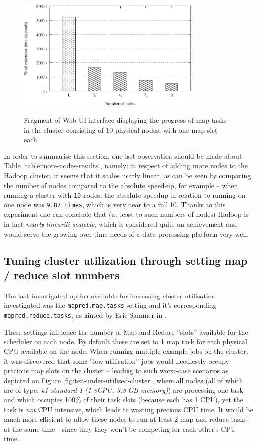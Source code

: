 \begin{figure}[ch!]
  \centering
  \includegraphics[width=0.80\textwidth]{img/hadoop/nodes-perf.pdf}
  \label{fig:nodes-pers-graph}
  \caption{Fragment of Web-UI interface displaying the progress of map tasks in the cluster consisting of 10 physical nodes, with one map slot each.}
\end{figure}

In order to summarise this section, one last observation should be made about Table \ref{table:more-nodes-results}, namely: in respect of adding more nodes to the Hadoop cluster, it seems that it scales nearly linear, as can be seen by comparing the number of nodes compared to the absolute speed-up, for example -- when running a cluster with \verb|10| nodes, the absolute speedup in relation to running on one node was \verb|9.87 times|, which is very near to a full 10. Thanks to this experiment one can conclude that (at least to such numbers of nodes) Hadoop is in fact \textit{nearly linearili scalable}, which is considered quite an achievement and would serve the growing-over-time needs of a data processing platform very well.


\subsection{Tuning cluster utilization through setting map / reduce slot numbers}
The last investigated option available for increasing cluster utilisation investigated was the \verb|mapred.map.tasks| setting and it's corresponding \verb|mapred.reduce.tasks|, as hinted by Eric Sammer in \cite{hadoop-ops}.

These settings influence the number of Map and Reduce ''slots'' available for the scheduler on each node. By default these are set to 1 map task for each physical CPU available on the node. When running multiple example jobs on the cluster, it was discovered that some ''low utilisation'' jobs would needlessly occupy precious map slots on the cluster -- leading to such worst-case scenarios as depicted on Figure \ref{fig:ten-under-utilised-cluster}, where all nodes (all of which are of type: \textit{n1-standard-1 (1 vCPU, 3.8 GB memory)}) are processing one task and which occupies 100\% of their task slots (because each has 1 CPU), yet the task is \textit{not} CPU intensive, which leads to wasting precious CPU time. It would be much more efficient to allow these nodes to run at least 2 map and reduce tasks at the same time - since they they won't be competing for each other's CPU time.

